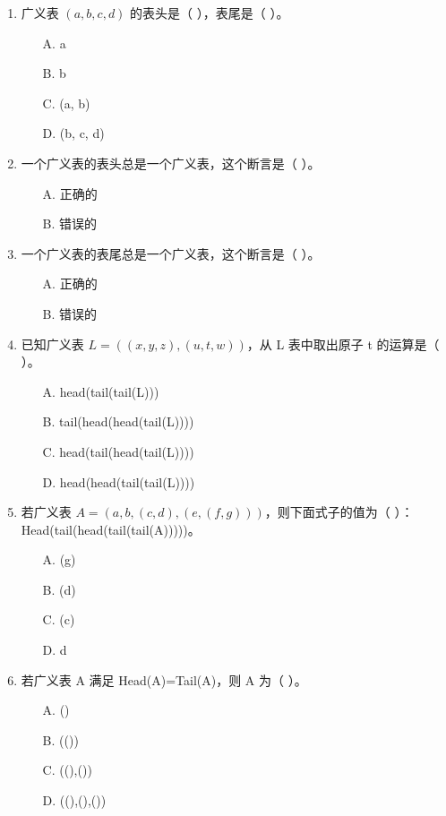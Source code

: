 \documentclass[12pt, a4paper]{article}
\begin{document}
\begin{enumerate}
    \item 广义表 $(a,b,c,d)$ 的表头是（ ），表尾是（ ）。
    \begin{enumerate}
        \item[A.] a
        \item[B.] b
        \item[C.] (a, b)
        \item[D.] (b, c, d)
    \end{enumerate}
    
    \item 一个广义表的表头总是一个广义表，这个断言是（ ）。
    \begin{enumerate}
        \item[A.] 正确的
        \item[B.] 错误的
    \end{enumerate}
    
    \item 一个广义表的表尾总是一个广义表，这个断言是（ ）。
    \begin{enumerate}
        \item[A.] 正确的
        \item[B.] 错误的
    \end{enumerate}
    
    \item 已知广义表 $L=((x, y, z), (u, t, w))$，从 L 表中取出原子 t 的运算是（ ）。
    \begin{enumerate}
        \item[A.] head(tail(tail(L)))
        \item[B.] tail(head(head(tail(L))))
        \item[C.] head(tail(head(tail(L))))
        \item[D.] head(head(tail(tail(L))))
    \end{enumerate}
    
    \item 若广义表 $A=(a,b,(c,d),(e,(f,g)))$，则下面式子的值为（ ）：Head(tail(head(tail(tail(A)))))。
    \begin{enumerate}
        \item[A.] (g)
        \item[B.] (d)
        \item[C.] (c)
        \item[D.] d
    \end{enumerate}
    
    \item 若广义表 A 满足 Head(A)=Tail(A)，则 A 为（ ）。
    \begin{enumerate}
        \item[A.] ()
        \item[B.] (())
        \item[C.] ((),())
        \item[D.] ((),(),())
    \end{enumerate}
\end{enumerate}
\end{document}
